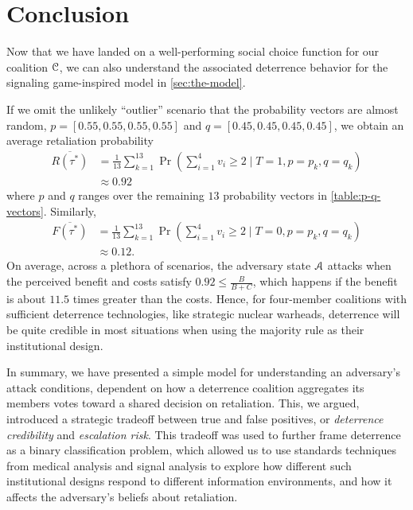 


\section{Conclusion}
Now that we have landed on a well-performing social choice function for our coalition $\EuScript{C}$, we can also understand the associated deterrence behavior for the signaling game-inspired model in \cref{sec:the-model}. 

If we omit the unlikely ``outlier'' scenario that the probability vectors are almost random, $p=[0.55,0.55,0.55,0.55]$ and $q=[0.45, 0.45, 0.45,0.45]$, we obtain an average retaliation probability 
\begin{align*}
    \overline{R(\tau^*)}
    &= \frac{1}{13}\sum_{k=1}^{13}\Pr\left(\sum_{i=1}^4 v_i \geq 2 \mid T=1, p = p_k, q=q_k\right) \\
    &\approx 0.92
\end{align*}
where $p$ and $q$ ranges over the remaining $13$ probability vectors in \cref{table:p-q-vectors}. Similarly, 
\begin{align*}
    \overline{F(\tau^*)}
    &= \frac{1}{13}\sum_{k=1}^{13}\Pr\left(\sum_{i=1}^4 v_i \geq 2 \mid T=0, p = p_k, q=q_k\right) \\
    &\approx 0.12.
\end{align*}
On average, across a plethora of scenarios, the adversary state $\EuScript{A}$ attacks when the perceived benefit and costs satisfy $0.92 \leq \frac{B}{B+C}$, which happens if the benefit is about $11.5$ times greater than the costs. Hence, for four-member coalitions with sufficient deterrence technologies, like strategic nuclear warheads, deterrence will be quite credible in most situations when using the majority rule as their institutional design.

In summary, we have presented a simple model for understanding an adversary's attack conditions, dependent on how a deterrence coalition aggregates its members votes toward a shared decision on retaliation. This, we argued, introduced a strategic tradeoff between true and false positives, or \emph{deterrence credibility} and \emph{escalation risk}. This tradeoff was used to further frame deterrence as a binary classification problem, which allowed us to use standards techniques from medical analysis and signal analysis to explore how different such institutional designs respond to different information environments, and how it affects the adversary's beliefs about retaliation. 


